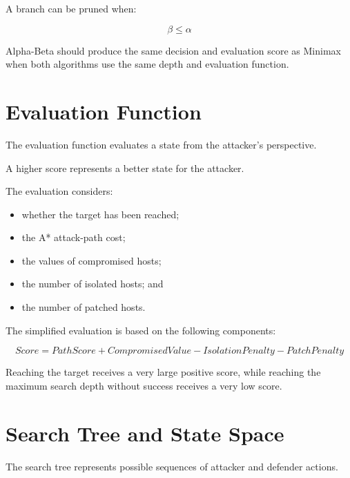 \documentclass[12pt,a4paper]{article}
\begin{document}
A branch can be pruned when:

\begin{equation}
\beta \leq \alpha
\end{equation}

Alpha-Beta should produce the same decision and evaluation score as Minimax
when both algorithms use the same depth and evaluation function.


\section{Evaluation Function}

The evaluation function evaluates a state from the attacker's perspective.

A higher score represents a better state for the attacker.

The evaluation considers:

\begin{itemize}
    \item whether the target has been reached;
    \item the A* attack-path cost;
    \item the values of compromised hosts;
    \item the number of isolated hosts; and
    \item the number of patched hosts.
\end{itemize}

The simplified evaluation is based on the following components:

\begin{equation}
Score =
PathScore +
CompromisedValue -
IsolationPenalty -
PatchPenalty
\end{equation}

Reaching the target receives a very large positive score, while reaching the
maximum search depth without success receives a very low score.


\section{Search Tree and State Space}

The search tree represents possible sequences of attacker and defender
actions.
\end{document}
